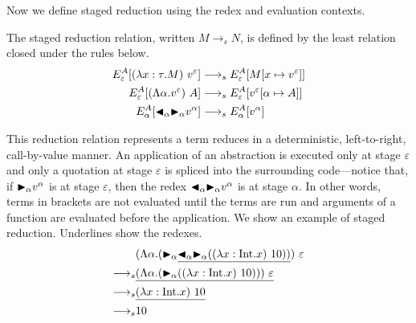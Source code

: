 Now we define staged reduction using the redex and evaluation contexts.

\begin{definition}
  The staged reduction relation, written $M \longrightarrow_s N$, is defined by
  the least relation closed under the rules below.
  \begin{align*}
    E^A_\varepsilon [(\lambda x:\tau.M)\ v^\varepsilon] & \longrightarrow_s E^A_\varepsilon[M[x\mapsto v^\varepsilon]]      \\
    E^A_\varepsilon [(\Lambda\alpha.v^\varepsilon)\ A]  & \longrightarrow_s E^A_\varepsilon[v^\varepsilon[\alpha\mapsto A]] \\
    E^A_\alpha [{\mathop{\blacktriangleleft}}_\alpha {\mathop{\blacktriangleright}}_\alpha v^\alpha]        & \longrightarrow_s E^A_\alpha[v^\alpha]                            \\
  \end{align*}
\end{definition}

This reduction relation represents a term reduces in a deterministic,
left-to-right, call-by-value manner.  An application of an abstraction
is executed only at stage \(\varepsilon\) and only a quotation at
stage \(\varepsilon\) is spliced into the surrounding code---notice
that, if \({\mathop{\blacktriangleright}}_\alpha v^\alpha\) is at stage \(\varepsilon\), then the
redex \({\mathop{\blacktriangleleft}}_\alpha {\mathop{\blacktriangleright}}_\alpha v^\alpha\) is at stage \(\alpha\).
In other words, terms in brackets are not evaluated until the terms are run
and arguments of a function are evaluated before the application.
We show an example of staged reduction.
Underlines show the redexes.
\begin{align*}
                    & (\Lambda\alpha.(\TB_\alpha \underline{\TBL_\alpha \TB_\alpha ((\lambda x:\I.x)\ 10))})\ \varepsilon \\
  \longrightarrow_s & \underline{(\Lambda\alpha.(\TB_\alpha ((\lambda x:\I.x)\ 10)))\ \varepsilon}                        \\
  \longrightarrow_s & \underline{(\lambda x:\I.x)\ 10}                                                                    \\
  \longrightarrow_s & 10
\end{align*}